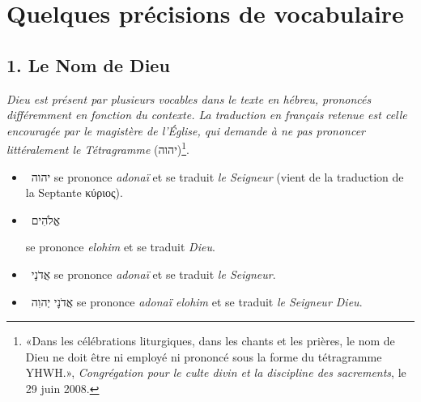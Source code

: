 \section*{Quelques précisions de vocabulaire}

\subsection*{1. Le Nom de Dieu}
\textit{Dieu est présent par plusieurs vocables dans le texte en hébreu, prononcés différemment en fonction du contexte. La traduction en français retenue est celle encouragée par le magistère de l'Église, qui demande à ne pas prononcer littéralement le Tétragramme} (\texthebrew{יהוה})\footnote{«Dans les célébrations liturgiques, dans les chants et les prières, le nom de Dieu ne doit être ni employé ni prononcé sous la forme du tétragramme YHWH.», \textit{Congrégation pour le culte divin et la discipline des sacrements}, le 29 juin 2008.}.\par
\begin{itemize}[label=]
    \item ~\texthebrew{יהוה} se prononce \textit{adonaï} et se traduit \textit{le Seigneur} (vient de la traduction de la Septante \textgreek{κύριος}).
    \item ~\texthebrew{אֱלֹהִים} \raggedright se prononce \textit{elohim} et se traduit \textit{Dieu}.
    \item ~\texthebrew{אֲדֹנָי} se prononce \textit{adonaï} et se traduit \textit{le Seigneur}.
    \item ~\texthebrew{אֲדֹנָי יְהוִה} se prononce \textit{adonaï elohim} et se traduit \textit{le Seigneur Dieu}.
\end{itemize}

